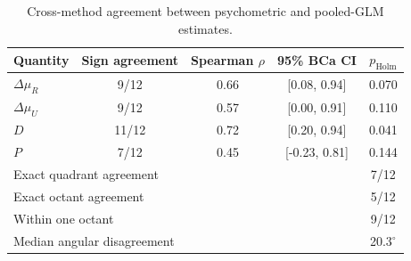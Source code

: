 \begin{table}[htbp]
\centering
\caption{Cross-method agreement between psychometric and pooled-GLM estimates.}
\label{tab:q1-convergence}
\begin{tabular}{lcccc}
\toprule
Quantity & Sign agreement & Spearman $\rho$ & 95\% BCa CI & $p_{\mathrm{Holm}}$ \\
\midrule
$\Delta\mu_R$ & 9/12 & 0.66 & [0.08, 0.94] & 0.070 \\
$\Delta\mu_U$ & 9/12 & 0.57 & [0.00, 0.91] & 0.110 \\
$D$ & 11/12 & 0.72 & [0.20, 0.94] & 0.041 \\
$P$ & 7/12 & 0.45 & [-0.23, 0.81] & 0.144 \\
\midrule
\multicolumn{4}{l}{Exact quadrant agreement} & 7/12 \\
\multicolumn{4}{l}{Exact octant agreement} & 5/12 \\
\multicolumn{4}{l}{Within one octant} & 9/12 \\
\multicolumn{4}{l}{Median angular disagreement} & 20.3$^\circ$ \\
\bottomrule
\end{tabular}
\end{table}
